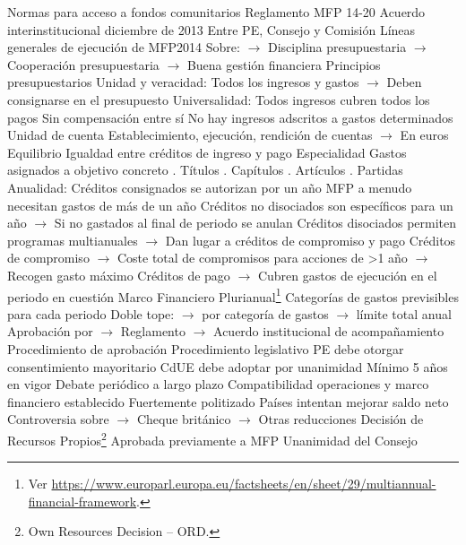 \documentclass{nuevotema}
\begin{document}
\begin{esquemal}
				\4[] Normas para acceso a fondos comunitarios
				\4 Reglamento MFP 14-20
				\4 Acuerdo interinstitucional diciembre de 2013
				\4[] Entre PE, Consejo y Comisión
				\4[] Líneas generales de ejecución de MFP2014
				\4[] Sobre:
				\4[] $\to$ Disciplina presupuestaria
				\4[] $\to$ Cooperación presupuestaria
				\4[] $\to$ Buena gestión financiera
			\3 Principios presupuestarios
				\4[U] Unidad y veracidad:
				\4[] Todos los ingresos y gastos
				\4[] $\to$ Deben consignarse en el presupuesto
				\4[U] Universalidad:
				\4[] Todos ingresos cubren todos los pagos
				\4[] Sin compensación entre sí
				\4[] No hay ingresos adscritos a gastos determinados
				\4[U] Unidad de cuenta
				\4[] Establecimiento, ejecución, rendición de cuentas
				\4[] $\to$ En euros
				\4[E] Equilibrio
				\4[] Igualdad entre créditos de ingreso y pago
				\4[E] Especialidad
				\4[] Gastos asignados a objetivo concreto
				. Títulos
				. Capítulos
				. Artículos
				. Partidas
				\4[A] Anualidad:
				\4[] Créditos consignados se autorizan por un año
				\4[] MFP a menudo necesitan gastos de más de un año
				\4[] Créditos no disociados son específicos para un año
				\4[] $\to$ Si no gastados al final de periodo se anulan
				\4[] Créditos disociados permiten programas multianuales
				\4[] $\to$ Dan lugar a créditos de compromiso y pago
				\4[] Créditos de compromiso
				\4[] $\to$ Coste total de compromisos para acciones de >1 año
				\4[] $\to$ Recogen gasto máximo
				\4[] Créditos de pago
				\4[] $\to$ Cubren gastos de ejecución en el periodo en cuestión
			\3 Marco Financiero Plurianual\footnote{Ver \url{https://www.europarl.europa.eu/factsheets/en/sheet/29/multiannual-financial-framework}.}
				\4 Categorías de gastos previsibles para cada periodo
				\4 Doble tope:
				\4[] $\to$ por categoría de gastos
				\4[] $\to$ límite total anual
				\4 Aprobación por
				\4[] $\to$ Reglamento
				\4[] $\to$ Acuerdo institucional de acompañamiento
				\4 Procedimiento de aprobación
				\4[] Procedimiento legislativo
				\4[] PE debe otorgar consentimiento mayoritario
				\4[] CdUE debe adoptar por unanimidad
				\4 Mínimo 5 años en vigor
				\4 Debate periódico a largo plazo
				\4 Compatibilidad operaciones y marco financiero establecido
				\4 Fuertemente politizado
				\4[] Países intentan mejorar saldo neto
				\4[] Controversia sobre
				\4[] $\to$ Cheque británico
				\4[] $\to$ Otras reducciones
			\3 Decisión de Recursos Propios\footnote{Own Resources Decision -- ORD.}
				\4 Aprobada previamente a MFP
				\4[] Unanimidad del Consejo

\end{esquemal}
\end{document}
